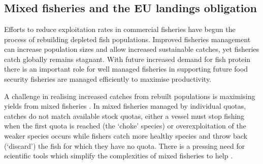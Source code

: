 \documentclass{nature}
\begin{document}
\section*{}
\subsection{Mixed fisheries and the EU landings obligation} 

 Efforts to reduce exploitation rates in commercial fisheries
have begun the process of rebuilding depleted fish populations\cite{Worm2009}.
Improved fisheries management  can increase
population sizes and allow increased sustainable catches, yet fisheries catch
globally remains stagnant\cite{FAO2016}. With future increased demand for fish
protein  there is an important role for well managed
fisheries in supporting future food security \cite{Mcclanahan2015}
   fisheries are managed efficiently to
maximise productivity.

A  challenge in realising increased catches
from rebuilt populations is maximising yields from mixed fisheries
\cite{Branch2008, Kuriyama2016, Ulrich2016}. In mixed fisheries managed by individual quotas,
 catches do not match available stock quotas,
either a vessel must stop fishing when the first quota is reached (the `choke'
species) or overexploitation of the weaker species occurs while fishers
 catch more healthy species and throw back (`discard') the
fish for which they have no quota\cite{Batsleer2015}.  There is a pressing need for scientific tools which simplify the
complexities of mixed fisheries to help . 
\end{document}
